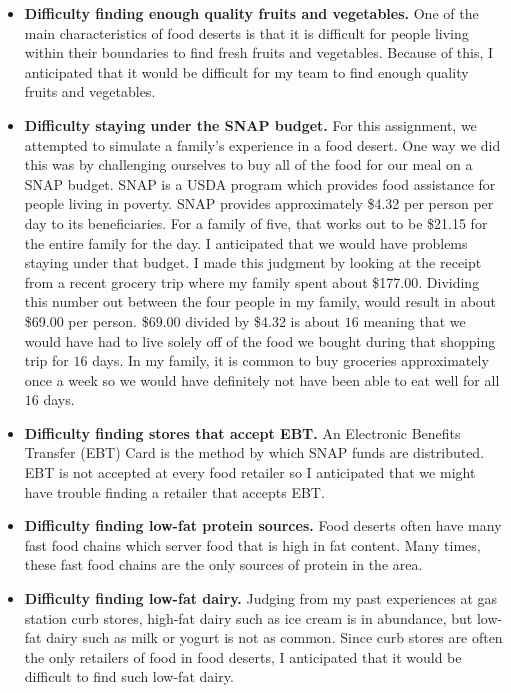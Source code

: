 \documentclass[11pt]{article}
\begin{document}
\begin{itemize}
    \item \textbf{Difficulty finding enough quality fruits and vegetables.} One of the main
        characteristics of food deserts is that it is difficult for people living within their
        boundaries to find fresh fruits and vegetables. Because of this, I anticipated that it would
        be difficult for my team to find enough quality fruits and vegetables.

    \item \textbf{Difficulty staying under the SNAP budget.} For this assignment, we attempted to
        simulate a family's experience in a food desert. One way we did this was by challenging
        ourselves to buy all of the food for our meal on a SNAP budget. SNAP is a USDA program which
        provides food assistance for people living in poverty. SNAP provides approximately \$4.32
        per person per day to its beneficiaries. For a family of five, that works out to be \$21.15
        for the entire family for the day. I anticipated that we would have problems staying under
        that budget. I made this judgment by looking at the receipt from a recent grocery trip where
        my family spent about \$177.00. Dividing this number out between the four people in my
        family, would result in about \$69.00 per person. \$69.00 divided by \$4.32 is about $16$
        meaning that we would have had to live solely off of the food we bought during that shopping
        trip for $16$ days. In my family, it is common to buy groceries approximately once a week so
        we would have definitely not have been able to eat well for all $16$ days.

    \item \textbf{Difficulty finding stores that accept EBT.} An Electronic Benefits Transfer (EBT)
        Card is the method by which SNAP funds are distributed. EBT is not accepted at every food
        retailer so I anticipated that we might have trouble finding a retailer that accepts EBT.

    \item \textbf{Difficulty finding low-fat protein sources.} Food deserts often have many fast
        food chains which server food that is high in fat content. Many times, these fast food
        chains are the only sources of protein in the area. %

    \item \textbf{Difficulty finding low-fat dairy.} Judging from my past experiences at gas station
        curb stores, high-fat dairy such as ice cream is in abundance, but low-fat dairy such as
        milk or yogurt is not as common. Since curb stores are often the only retailers of food in
        food deserts, I anticipated that it would be difficult to find such low-fat dairy.


\end{itemize}
\end{document}
